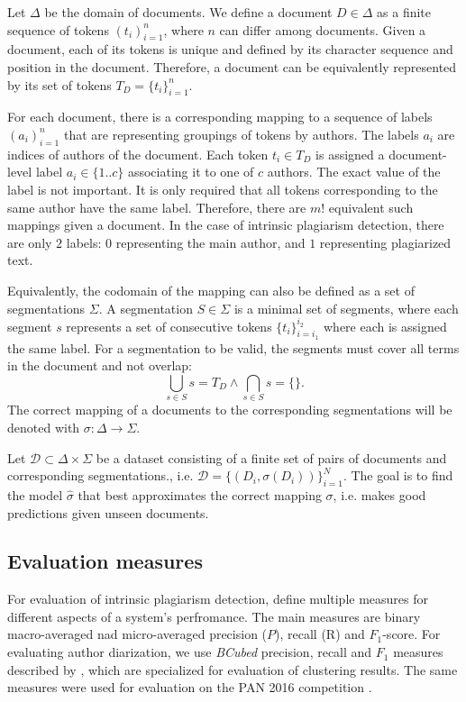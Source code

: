 \documentclass[10pt, a4paper]{article}
\begin{document}
Let $\Delta$ be the domain of documents. We define a document $D\in \Delta$ as a finite sequence of tokens $(t_i)_{i=1}^n$, where $n$ can differ among documents. Given a document, each of its tokens is unique and defined by its character sequence and position in the document. Therefore, a document can be equivalently represented by its set of tokens $T_D=\{t_i\}_{i=1}^n$.

For each document, there is a corresponding mapping to a sequence of labels $(a_i)_{i=1}^n$ that are representing groupings of tokens by authors. The labels $a_i$ are indices of authors of the document. Each token $t_i\in T_D$ is assigned a document-level label $a_i \in \{1..c\}$ associating it to one of $c$ authors. The exact value of the label is not important. It is only required that all tokens corresponding to the same author have the same label. Therefore, there are $m!$ equivalent such mappings given a document. In the case of intrinsic plagiarism detection, there are only $2$ labels: $0$ representing the main author, and $1$ representing plagiarized text.

Equivalently, the codomain of the mapping can also be defined as a set of segmentations $\Sigma$. A segmentation $S\in \Sigma$ is a minimal set of segments, where each segment $s$ represents a set of consecutive tokens $\{t_i\}_{i=i_1}^{i_2}$ where each is assigned the same label. For a segmentation to be valid, the segments must cover all terms in the document and not overlap:
\begin{equation}
	\bigcup_{s\in S}s = T_D  \wedge \bigcap_{s\in S}s = \{\}.
\end{equation}
The correct mapping of a documents to the corresponding segmentations will be denoted with $\sigma: \Delta\rightarrow\Sigma$.

Let $\mathcal{D} \subset \Delta\times\Sigma$ be a dataset consisting of a finite set of pairs of documents and corresponding segmentations., i.e. $\mathcal{D} = \{\left(D_i, \sigma(D_i)\right)\}_{i=1}^N$. The goal is to find the model $\hat{\sigma}$ that best approximates the correct mapping $\sigma$, i.e. makes good predictions given unseen documents.

\subsection{Evaluation measures}

For evaluation of intrinsic plagiarism detection, \citet{stein-2010} define multiple measures for different aspects of a system's perfromance. The main measures are binary macro-averaged nad micro-averaged precision ($P$), recall (R) and $F_1$-score. For evaluating author diarization, we use \emph{BCubed} precision, recall and $F_1$ measures described by \citet{amigo-2009}, which are specialized for evaluation of clustering results. The same measures were used for evaluation on the PAN 2016 competition \citep{rosso-2016}.
\end{document}
